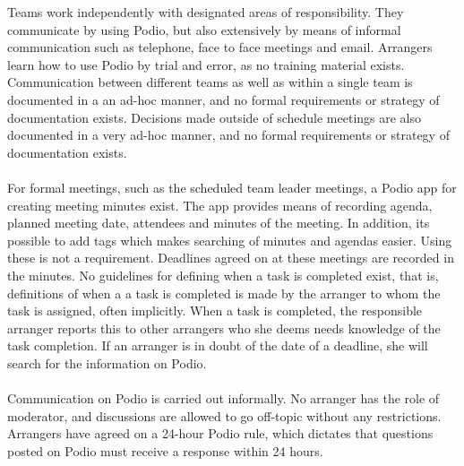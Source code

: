 


Teams work independently with designated areas of responsibility. They communicate by using Podio, but also extensively by means of informal communication such as telephone, face to face meetings and email. Arrangers learn how to use Podio by trial and error, as no training material exists. Communication between different teams as well as within a single team is documented in a an ad-hoc manner, and no formal requirements or strategy of documentation exists. Decisions made outside of schedule meetings are also documented in a very ad-hoc manner, and no formal requirements or strategy of documentation exists.
\\ \\
For formal meetings, such as the scheduled team leader meetings, a Podio app for creating meeting minutes exist. The app provides means of recording agenda, planned meeting date, attendees and minutes of the meeting. In addition, its possible to add tags which makes searching of minutes and agendas easier. Using these is not a requirement. Deadlines agreed on at these meetings are recorded in the minutes. No guidelines for defining when a task is completed exist, that is, definitions of when a a task is completed is made by the arranger to whom the task is assigned, often implicitly. When a task is completed, the responsible arranger reports this to other arrangers who she deems needs knowledge of the task completion. If an arranger is in doubt of the date of a deadline, she will search for the information on Podio.
\\ \\
Communication on Podio is carried out informally. No arranger has the role of moderator, and discussions are allowed to go off-topic without any restrictions. Arrangers have agreed on a 24-hour Podio rule, which dictates that questions posted on Podio must receive a response within 24 hours.



